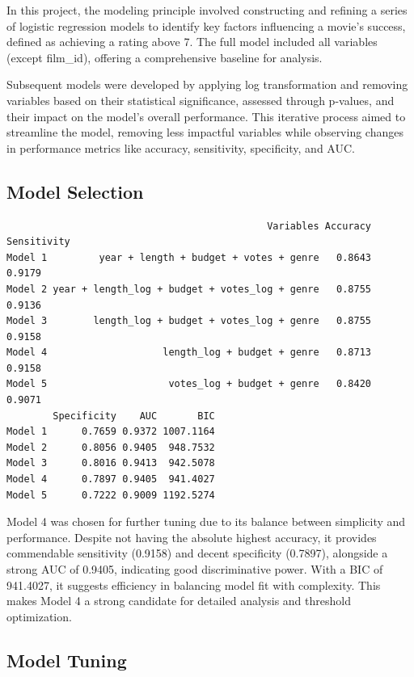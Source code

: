 \documentclass[
  11pt,
]{article}
\begin{document}
In this project, the modeling principle involved constructing and
refining a series of logistic regression models to identify key factors
influencing a movie's success, defined as achieving a rating above 7.
The full model included all variables (except film\_id), offering a
comprehensive baseline for analysis.

Subsequent models were developed by applying log transformation and
removing variables based on their statistical significance, assessed
through p-values, and their impact on the model's overall performance.
This iterative process aimed to streamline the model, removing less
impactful variables while observing changes in performance metrics like
accuracy, sensitivity, specificity, and AUC.

\hypertarget{model-selection}{%
\subsection{Model Selection}\label{model-selection}}

\begin{verbatim}
                                             Variables Accuracy Sensitivity
Model 1         year + length + budget + votes + genre   0.8643      0.9179
Model 2 year + length_log + budget + votes_log + genre   0.8755      0.9136
Model 3        length_log + budget + votes_log + genre   0.8755      0.9158
Model 4                    length_log + budget + genre   0.8713      0.9158
Model 5                     votes_log + budget + genre   0.8420      0.9071
        Specificity    AUC       BIC
Model 1      0.7659 0.9372 1007.1164
Model 2      0.8056 0.9405  948.7532
Model 3      0.8016 0.9413  942.5078
Model 4      0.7897 0.9405  941.4027
Model 5      0.7222 0.9009 1192.5274
\end{verbatim}

Model 4 was chosen for further tuning due to its balance between
simplicity and performance. Despite not having the absolute highest
accuracy, it provides commendable sensitivity (0.9158) and decent
specificity (0.7897), alongside a strong AUC of 0.9405, indicating good
discriminative power. With a BIC of 941.4027, it suggests efficiency in
balancing model fit with complexity. This makes Model 4 a strong
candidate for detailed analysis and threshold optimization.

\hypertarget{model-tuning}{%
\subsection{Model Tuning}\label{model-tuning}}
\end{document}
